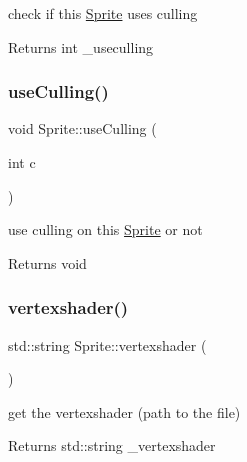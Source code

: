 check if this \hyperlink{class_sprite}{Sprite} uses culling 

\begin{DoxyReturn}{Returns}
int \+\_\+useculling 
\end{DoxyReturn}
\mbox{\label{class_sprite_acf75b5a4882d1cb20a77244feeb0d2f3}} 
\subsubsection{\texorpdfstring{use\+Culling()}{useCulling()}\hspace{0.1cm}{\footnotesize\ttfamily [2/2]}}
{\footnotesize\ttfamily void Sprite\+::use\+Culling (\begin{DoxyParamCaption}\item[{int}]{c }\end{DoxyParamCaption})\hspace{0.3cm}{\ttfamily [inline]}}



use culling on this \hyperlink{class_sprite}{Sprite} or not 

\begin{DoxyReturn}{Returns}
void 
\end{DoxyReturn}
\mbox{\label{class_sprite_aae341238d43e34f9e479355f72902cda}} 
\subsubsection{\texorpdfstring{vertexshader()}{vertexshader()}\hspace{0.1cm}{\footnotesize\ttfamily [1/2]}}
{\footnotesize\ttfamily std\+::string Sprite\+::vertexshader (\begin{DoxyParamCaption}{ }\end{DoxyParamCaption})\hspace{0.3cm}{\ttfamily [inline]}}



get the vertexshader (path to the file) 

\begin{DoxyReturn}{Returns}
std\+::string \+\_\+vertexshader 
\end{DoxyReturn}
\mbox{\label{class_sprite_ac5271cb1c478761a433969f03699894c}} 
